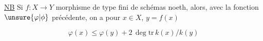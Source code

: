 
\uline{NB} Si $f:X\to Y$ morphisme de type fini de schémas  noeth, alors, avec la fonction $\unsure{\varphi|\phi}$ précédente, on a pour $x\in X$, $y=f(x)$

\[ \varphi(x)\leq\varphi(y)+2\,\deg\mathrm{tr}\,k(x)/k(y) \]

